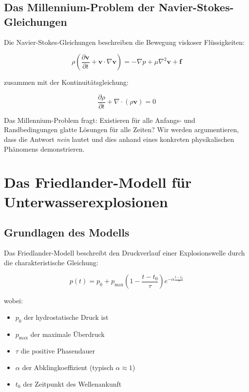 ﻿\documentclass[12pt,a4paper]{article}
\theoremstyle{definition}
\theoremstyle{remark}
\begin{document}
\subsection{Das Millennium-Problem der Navier-Stokes-Gleichungen}

Die Navier-Stokes-Gleichungen beschreiben die Bewegung viskoser Flüssigkeiten:

\begin{equation}
\rho \left( \frac{\partial \mathbf{v}}{\partial t} + \mathbf{v} \cdot \nabla \mathbf{v} \right) = -\nabla p + \mu \nabla^2 \mathbf{v} + \mathbf{f}
\end{equation}

zusammen mit der Kontinuitätsgleichung:

\begin{equation}
\frac{\partial \rho}{\partial t} + \nabla \cdot (\rho \mathbf{v}) = 0
\end{equation}

Das Millennium-Problem fragt: Existieren für alle Anfangs- und Randbedingungen glatte Lösungen für alle Zeiten? Wir werden argumentieren, dass die Antwort \textit{nein} lautet und dies anhand eines konkreten physikalischen Phänomens demonstrieren.

\section{Das Friedlander-Modell für Unterwasserexplosionen}

\subsection{Grundlagen des Modells}

Das Friedlander-Modell beschreibt den Druckverlauf einer Explosionswelle durch die charakteristische Gleichung:

\begin{equation}
p(t) = p_0 + p_{\text{max}} \left(1 - \frac{t-t_0}{\tau}\right) e^{-\alpha \frac{t-t_0}{\tau}}
\end{equation}

wobei:
\begin{itemize}
\item $p_0$ der hydrostatische Druck ist
\item $p_{\text{max}}$ der maximale Überdruck
\item $\tau$ die positive Phasendauer
\item $\alpha$ der Abklingkoeffizient (typisch $\alpha \approx 1$)
\item $t_0$ der Zeitpunkt des Wellenankunft
\end{itemize}
\end{document}
